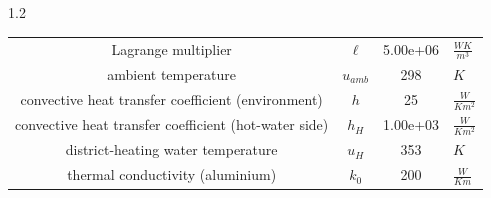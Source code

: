 \documentclass[preview]{standalone}
\begin{document}
\begin{spacing}{1.2}
\begin{tabular}{cccl}
\toprule
Lagrange multiplier & $\ell$ & 5.00e+06 & $\frac{W K}{m^3}$ \\ 
ambient temperature & $u_{amb}$ & 298 & $K$ \\ 
convective heat transfer coefficient (environment) & $h$ & 25 & $\frac{W}{K m^2}$ \\ 
convective heat transfer coefficient (hot-water side) & $h_{H}$ & 1.00e+03 & $\frac{W}{K m^2}$ \\ 
district-heating water temperature & $u_{H}$ & 353 & $K$ \\ 
thermal conductivity (aluminium) & $k_{0}$ & 200 & $\frac{W}{K m}$ \\ 
\bottomrule
\end{tabular}
\end{spacing}
\end{document}
